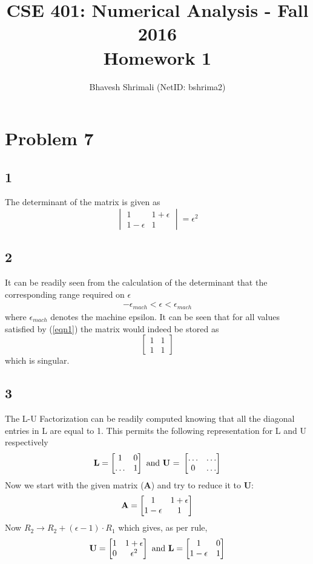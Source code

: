 \documentclass[11pt]{article}
\title{\bf CSE 401: Numerical Analysis - Fall 2016 \\ Homework 1}
\author{Bhavesh Shrimali (NetID: bshrima2)}
\begin{document}
\maketitle
\section*{Problem 7}
\noindent 
\subsection*{1}
The determinant of the matrix is given as
\[
\begin{vmatrix}
    1 & 1+{\epsilon} \\
    1-{\epsilon} & 1  
\end{vmatrix}
 = {\epsilon}^2
\]
\subsection*{2}
It can be readily seen from the calculation of the determinant that the corresponding range required on $\epsilon$
\begin{align}
 -\epsilon_{mach} < \epsilon < \epsilon_{mach}
\label{eqn1}
\end{align}
where $\epsilon_{mach}$ denotes the machine epsilon. It can be seen that for all values satisfied by (\ref{eqn1}) the matrix would indeed be stored as 
\[
\begin{bmatrix}
    1 & 1 \\
    1 & 1  
\end{bmatrix}
\]
which is singular. 
\subsection*{3} The L-U Factorization can be readily computed knowing that all the diagonal entries in L are equal to 1.
This permits the following representation for L and U respectively
\[
{\bf L} = 
\begin{bmatrix}
    1 & 0 \\
    \dots & 1  
\end{bmatrix}
\text{ and {\bf U} = }
\begin{bmatrix}
 	\dots & \dots \\
    0 & \dots  
\end{bmatrix}
\]
Now we start with the given matrix ({\bf A}) and try to reduce it to {\bf U}:
\[
{\bf A} = 
\begin{bmatrix}
    1 & 1+{\epsilon} \\
    1-\epsilon & 1  
\end{bmatrix}
\]
Now $R_2 \rightarrow R_2 + (\epsilon -1)\cdot R_1$ which gives, as per rule,
\[
{\bf U} = 
\begin{bmatrix}
1 & 1+\epsilon\\
0 & {\epsilon}^2
\end{bmatrix}
\text{ and } {\bf L }
= 
\begin{bmatrix}
1 &0\\
1-\epsilon &1
\end{bmatrix}
\]
\end{document}
